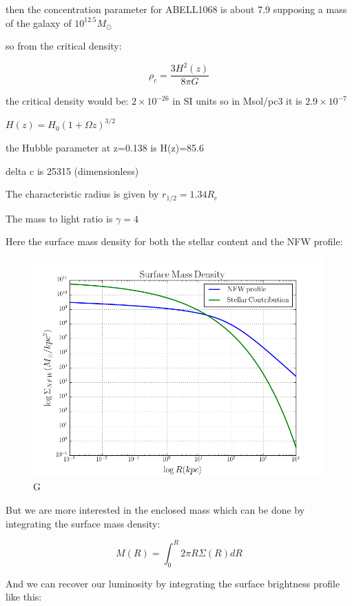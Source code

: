 then the concentration parameter for ABELL1068 is about 7.9 supposing a mass of the galaxy of $10^{12.5}M_{\odot}$

so from the critical density:

\begin{equation}
\rho_{c}=\frac{3H^2(z)}{8\pi G}
\end{equation}

the critical density would be: $2\times 10^{-26}$ in SI units so in Msol/pc3 it is $2.9\times 10^{-7}$

$H(z)=H_{0}(1+\Omega z)^{3/2}$

the Hubble parameter at z=0.138 is H(z)=85.6

delta c is 25315 (dimensionless)

The characteristic radius is given by $r_{1/2}=1.34R_{e}$

The mass to light ratio is $\gamma=4$

Here the surface mass density for both the stellar content and the NFW profile:

\begin{figure}[H]
\centering
\includegraphics[width=12cm]{images/Surface_mass_density_log.png}
\caption[M]{G}
\end{figure}

But we are more interested in the enclosed mass which can be done by integrating the surface mass density:

\begin{equation}
M(R)=\int_{0}^{R}2\pi R\Sigma(R)dR
\end{equation}

And we can recover our luminosity by integrating the surface brightness profile like this:

